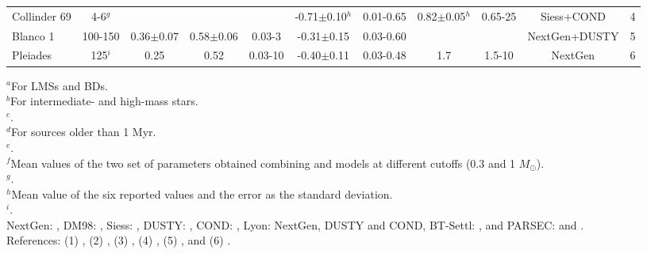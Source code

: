 \documentclass[12pt]{article}
\begin{document}
\begin{table}
\begin{threeparttable}
\begin{tabular}{@{\extracolsep{2pt}}lcccccccccc@{}}
   Collinder 69 & 4-6$^g$     &              &               &              & -0.71$\pm$0.10$^h$ & 0.01-0.65  & 0.82$\pm$0.05$^h$ & 0.65-25 & Siess+COND    & 4 \\
   Blanco 1     & 100-150     &0.36$\pm$0.07 & 0.58$\pm$0.06 & 0.03-3       & -0.31$\pm$0.15     & 0.03-0.60  &                   &         & NextGen+DUSTY & 5 \\
   Pleiades     & 125$^i$     & 0.25          & 0.52          & 0.03-10      & -0.40$\pm$0.11     & 0.03-0.48  & 1.7               & 1.5-10  & NextGen       & 6 \\
   \hline
  \end{tabular}
  \begin{tablenotes}
    $^a$For LMSs and BDs.\\
    $^b$For intermediate- and high-mass stars.\\
    $^c$\citet{Getman2014b}.\\
    $^d$For sources older than 1 Myr.\\
    $^e$\citet{ZapateroOsorio2002}.\\
    $^f$Mean values of the two set of parameters obtained combining \citet{Baraffe1998} and \citet{Siess2000} models at different cutoffs (0.3 and 1 $M_\odot$).\\
    $^g$\citet{Dolan1999}.\\
    $^h$Mean value of the six reported values and the error as the standard deviation.\\
    $^i$\citet{Stauffer1998}.\\

    NextGen: \citet{Baraffe1998}, \ac{DM98}: \citet{DAntona1998}, \ac{Siess}: \citet{Siess2000}, \ac{DUSTY}: \citep{Chabrier2000}, \ac{COND}: \citep{Baraffe2003}, \ac{Lyon}: NextGen, DUSTY and COND, \ac{BT-Settl}: \citet{Baraffe2015}, and \ac{PARSEC}: \citet{Bressan2012} and \citet{Chen2014}.\\

    References: (1) \citet{Muzic2017}, (2) \citet{DaRio2012}, (3) \citet{PenaRamirez2012}, (4) \citet{Bayo2011}, (5) \citet{Moraux2007a}, and (6) \citet{Moraux2003}.
  \end{tablenotes}
 \end{threeparttable}
\end{table}
\end{document}
